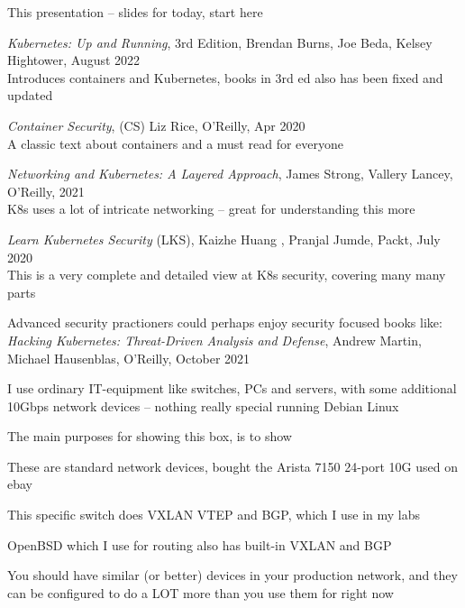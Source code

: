 \documentclass[Screen16to9,17pt]{foils}
\begin{document}
\begin{list2}
\item This presentation -- slides for today, start here
\item \emph{Kubernetes: Up and Running}, 3rd Edition, Brendan Burns, Joe Beda, Kelsey Hightower,
August 2022\\
Introduces containers and Kubernetes, books in 3rd ed also has been fixed and updated
\item \emph{Container Security}, (CS) Liz Rice, O'Reilly, Apr 2020\\
A classic text about containers and a must read for everyone
\item \emph{Networking and Kubernetes: A Layered Approach}, James Strong, Vallery Lancey, O'Reilly, 2021\\
K8s uses a lot of intricate networking -- great for understanding this more
\item \emph{Learn Kubernetes Security} (LKS), Kaizhe Huang , Pranjal Jumde, Packt, July 2020\\
This is a very complete and detailed view at K8s security, covering many many parts
\item Advanced security practioners could perhaps enjoy security focused books like:\\
\emph{Hacking Kubernetes: Threat-Driven Analysis and Defense}, Andrew Martin, Michael Hausenblas, O'Reilly, October 2021
\end{list2}



I use ordinary IT-equipment like switches, PCs and servers, with some additional 10Gbps network devices -- nothing really special running Debian Linux

The main purposes for showing this box, is to show
\begin{list2}
\item These are standard network devices, bought the Arista 7150 24-port 10G used on ebay
\item This specific switch does VXLAN VTEP and BGP, which I use in my labs
\item OpenBSD which I use for routing also has built-in VXLAN and BGP
\end{list2}

You should have similar (or better) devices in your production network, and they can be
configured to do a LOT more than you use them for right now
\end{document}
